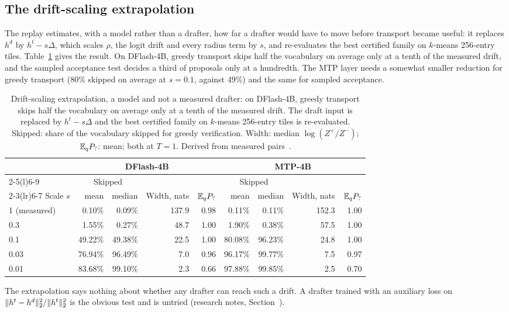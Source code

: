 \subsection{The drift-scaling extrapolation}\label{app:transport-scaling}
The replay estimates, with a model rather than a drafter, how far a drafter would have to move before transport became useful: it replaces $h^d$ by $h^t-s\Delta$, which scales $\rho$, the logit drift and every radius term by $s$, and re-evaluates the best certified family on $k$-means 256-entry tiles. Table~\ref{tab:transport-scaling} gives the result. On DFlash-4B, greedy transport skips half the vocabulary on average only at a tenth of the measured drift, and the sampled acceptance test decides a third of proposals only at a hundredth. The MTP layer needs a somewhat smaller reduction for greedy transport (80\% skipped on average at $s=0.1$, against 49\%) and the same for sampled acceptance.

\begin{table}[htbp]
\tablefont\centering
\caption{Drift-scaling extrapolation, a model and not a measured drafter: on DFlash-4B, greedy transport skips half the vocabulary on average only at a tenth of the measured drift. The draft input is replaced by $h^t-s\Delta$ and the best certified family on $k$-means 256-entry tiles is re-evaluated. Skipped: share of the vocabulary skipped for greedy verification. Width: median $\log(Z^+/Z^-)$; $\mathbb E_qP_?$: mean; both at $T=1$. Derived from measured pairs~.}
\label{tab:transport-scaling}
\vskip 0.05in
\begin{tabular}{@{}lrrrrrrrr@{}}\toprule
& \multicolumn{4}{c}{DFlash-4B} & \multicolumn{4}{c}{MTP-4B}\\\cmidrule(lr){2-5}\cmidrule(l){6-9}
& \multicolumn{2}{c}{Skipped} & & & \multicolumn{2}{c}{Skipped} & &\\\cmidrule(lr){2-3}\cmidrule(lr){6-7}
Scale $s$ & mean & median & Width, nats & $\mathbb E_qP_?$ & mean & median & Width, nats & $\mathbb E_qP_?$\\\midrule
1 (measured) & 0.10\% & 0.09\% & 137.9 & 0.98 & 0.11\% & 0.11\% & 152.3 & 1.00\\
0.3 & 1.55\% & 0.27\% & 48.7 & 1.00 & 1.90\% & 0.38\% & 57.5 & 1.00\\
0.1 & 49.22\% & 49.38\% & 22.5 & 1.00 & 80.08\% & 96.23\% & 24.8 & 1.00\\
0.03 & 76.94\% & 96.49\% & 7.0 & 0.96 & 96.17\% & 99.77\% & 7.5 & 0.97\\
0.01 & 83.68\% & 99.10\% & 2.3 & 0.66 & 97.88\% & 99.85\% & 2.5 & 0.70\\\bottomrule
\end{tabular}
\end{table}

The extrapolation says nothing about whether any drafter can reach such a drift. A drafter trained with an auxiliary loss on $\lVert h^t-h^d\rVert_2^2/\lVert h^t\rVert_2^2$ is the obvious test and is untried (research notes, Section~).

